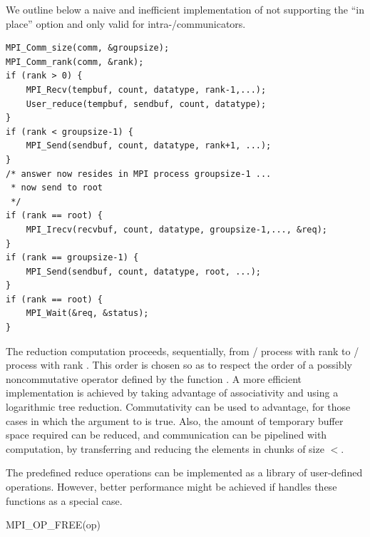 \begin{implementors}
We outline below a naive and inefficient implementation of 
not
supporting the ``in place'' option and only valid for intra\hyphen/communicators.

\begin{lstlisting}[language={[MPI]C}]
MPI_Comm_size(comm, &groupsize);
MPI_Comm_rank(comm, &rank);
if (rank > 0) {
    MPI_Recv(tempbuf, count, datatype, rank-1,...);
    User_reduce(tempbuf, sendbuf, count, datatype);
}
if (rank < groupsize-1) {
    MPI_Send(sendbuf, count, datatype, rank+1, ...);
}
/* answer now resides in MPI process groupsize-1 ...
 * now send to root
 */
if (rank == root) {
    MPI_Irecv(recvbuf, count, datatype, groupsize-1,..., &req);
}
if (rank == groupsize-1) {
    MPI_Send(sendbuf, count, datatype, root, ...);
}
if (rank == root) {
    MPI_Wait(&req, &status);
}
\end{lstlisting}

The reduction computation proceeds, sequentially, from \MPI/ process with rank 
to \MPI/ process with rank
\gb{}.
This order is chosen so as to respect
the order of a possibly noncommutative operator defined by the
function .
A more efficient implementation is achieved by taking advantage
of associativity and
using a logarithmic tree reduction.  Commutativity can be used
to advantage, for those cases in which the  argument
to  is true.  Also, the amount of temporary buffer
space required can be reduced, and communication can be pipelined with
computation, by transferring and reducing the elements in chunks of
size  $<$.

The predefined reduce operations can be implemented as a library of
user-defined operations.  However, better performance might be
achieved if  handles these functions as a special
case.
\end{implementors}

%
\begin{funcdef}{MPI\_OP\_FREE}{(\mbox{op})}
\end{funcdef}

